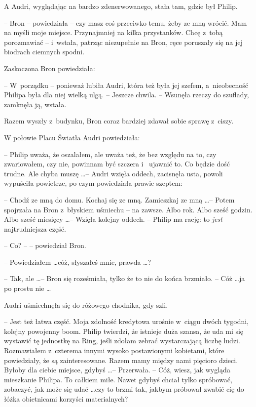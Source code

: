 \documentclass[oneside,polish,11pt,rmheadings]{mwbk}
\begin{document}
A Audri, wyglądając na bardzo zdenerwowanego, stała tam, gdzie był Philip. 

-- Bron -- powiedziała -- czy masz coś przeciwko temu, żeby ze mną wrócić. Mam na myśli moje miejsce. Przynajmniej na kilka przystanków. Chcę z~tobą porozmawiać -- i~wstała, patrząc niezupełnie na Bron, ręce poruszały się na jej biodrach ciemnych spodni. 

Zaskoczona Bron powiedziała: 

-- W~porządku -- ponieważ lubiła Audri, która też była jej szefem, a~nieobecność Philipa była dla niej wielką ulgą. -- Jeszcze chwila. --  Wsunęła rzeczy do szuflady, zamknęła ją, wstała. 

Razem wyszły z~budynku, Bron coraz bardziej zdawał sobie sprawę z~ciszy. 

W połowie Placu Światła Audri powiedziała: 

-- Philip uważa, że oszalałem, ale uważa też, że bez względu na to, czy zwariowałem, czy nie, powinnam być szczera i~ ujawnić to. Co będzie dość trudne. Ale chyba muszę \ldots -- Audri wzięła oddech, zacisnęła usta, powoli wypuściła powietrze, po czym powiedziała prawie szeptem: 

-- Chodź ze mną do domu. Kochaj się ze mną. Zamieszkaj ze mną \ldots  -- Potem spojrzała na Bron z~błyskiem uśmiechu -- na zawsze. Albo rok. Albo sześć godzin. Albo sześć miesięcy \ldots  -- Wzięła kolejny oddech. -- Philip ma rację: to \textit{jest }najtrudniejsza część. 

-- Co?  -- -- powiedział Bron. 

-- Powiedziałem \ldots  cóż, słyszałeś mnie, prawda \ldots ?  

-- Tak, ale \ldots  -- Bron się roześmiała, tylko że to nie do końca brzmiało. -- Cóż \ldots   ja po prostu nie \ldots  

Audri uśmiechnęła się do różowego chodnika, gdy szli. 

-- Jest też łatwa część. Moja zdolność kredytowa urośnie w~ciągu dwóch tygodni, kolejny powojenny boom. Philip twierdzi, że istnieje duża szansa, że uda mi się wystawić tę jednostkę na Ring, jeśli zdołam zebrać wystarczającą liczbę ludzi. Rozmawiałem z~czterema innymi wysoko postawionymi kobietami, które powiedziały, że są zainteresowane. Razem mamy między nami pięcioro dzieci. Byłoby dla ciebie miejsce, gdybyś \ldots  -- Przerwała. -- Cóż, wiesz, jak wygląda mieszkanie Philipa. To całkiem miłe. Nawet gdybyś chciał tylko spróbować, zobaczyć, jak może się udać \ldots  czy to brzmi tak, jakbym próbował zwabić cię do łóżka obietnicami korzyści materialnych?
\end{document}
